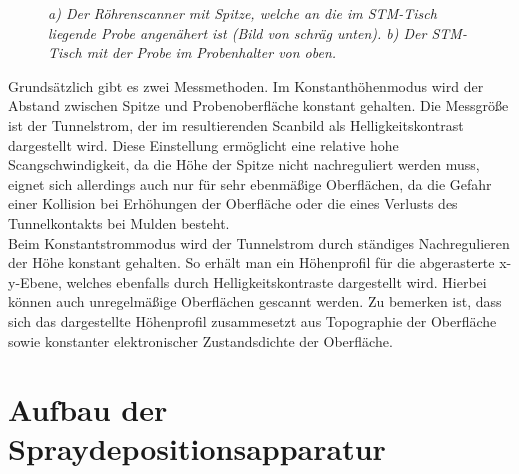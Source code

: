 \begin{figure}[H]
\centering
\sffamily

\caption{\textit{a) Der Röhrenscanner mit Spitze, welche an die im STM-Tisch
liegende Probe angenähert ist (Bild von schräg unten). b) Der STM-Tisch mit der
Probe im Probenhalter von oben.}}
\label{stmaufbau}
\end{figure}

Grundsätzlich gibt es zwei Messmethoden. Im Konstanthöhenmodus wird der Abstand zwischen Spitze und
Probenoberfläche konstant gehalten. Die Messgröße ist der Tunnelstrom, der im resultierenden
Scanbild als Helligkeitskontrast dargestellt wird. Diese Einstellung ermöglicht eine relative hohe
Scangschwindigkeit, da die Höhe der Spitze nicht nachreguliert werden muss, eignet sich
allerdings auch nur für sehr ebenmäßige Oberflächen, da die Gefahr einer Kollision bei Erhöhungen
der Oberfläche oder die eines Verlusts des Tunnelkontakts bei Mulden besteht.
\\
Beim Konstantstrommodus wird der Tunnelstrom durch ständiges Nachregulieren der Höhe konstant
gehalten. So erhält man ein Höhenprofil für die abgerasterte x-y-Ebene, welches ebenfalls durch
Helligkeitskontraste dargestellt wird. Hierbei können auch unregelmäßige Oberflächen gescannt
werden. Zu bemerken ist, dass sich das dargestellte Höhenprofil zusammesetzt aus Topographie der
Oberfläche sowie konstanter elektronischer Zustandsdichte der Oberfläche.

\FloatBarrier

\section{Aufbau der Spraydepositionsapparatur}


